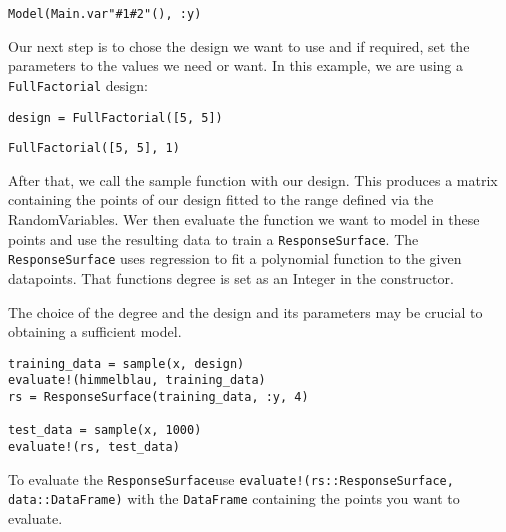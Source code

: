 \begin{verbatim}
Model(Main.var"#1#2"(), :y)
\end{verbatim}



Our next step is to chose the design we want to use and if required, set the parameters to the values we need or want. In this example, we are using a \texttt{FullFactorial} design:




\begin{verbatim}
design = FullFactorial([5, 5])
\end{verbatim}


\begin{verbatim}
FullFactorial([5, 5], 1)
\end{verbatim}



After that, we call the sample function with our design. This produces a matrix containing the points of our design fitted to the range defined via the RandomVariables. Wer then evaluate the function we want to model in these points and use the resulting data to train a \texttt{ResponseSurface}. The \texttt{ResponseSurface} uses regression to fit a polynomial function to the given datapoints. That functions degree is set as an Integer in the constructor.



\begin{tcolorbox}[toptitle=-1mm,bottomtitle=1mm,colback=admonition-note!50!white,colframe=admonition-note,title=\textbf{Note}]
The choice of the degree and the design and its parameters may be crucial to obtaining a sufficient model.

\end{tcolorbox}



\begin{verbatim}
training_data = sample(x, design)
evaluate!(himmelblau, training_data)
rs = ResponseSurface(training_data, :y, 4)

test_data = sample(x, 1000)
evaluate!(rs, test_data)
\end{verbatim}



To evaluate the \texttt{ResponseSurface}use \texttt{evaluate!(rs::ResponseSurface, data::DataFrame)} with the \texttt{DataFrame} containing the points you want to evaluate.



